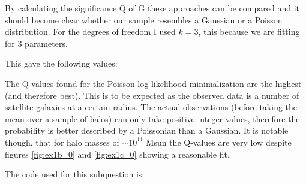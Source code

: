 By calculating the significance Q of G these approaches can be compared and it should become clear whether our sample resembles a Gaussian or a Poisson distribution.
For the degrees of freedom I used $k=3$, this because we are fitting for 3 parameters.

This gave the following values:


The Q-values found for the Poisson log likelihood minimalization are the highest (and therefore best).
This is to be expected as the observed data is a number of satellite galaxies at a certain radius.
The actual observations (before taking the mean over a sample of halos) can only take positive integer values, therefore the probability is better described by a Poissonian than a Gaussian.
It is notable though, that for halo masses of $\sim 10^{11}$ Msun the Q-values are very low despite figures \ref{fig:ex1b_0} and \ref{fig:ex1c_0} showing a reasonable fit.

The code used for this subquestion is:
